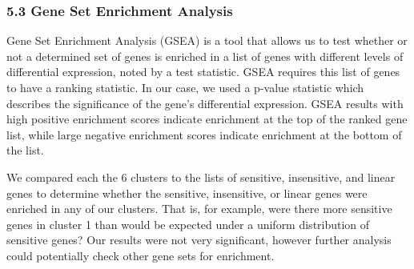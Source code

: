 \documentclass[]{article}
\begin{document}
\subsubsection{\texorpdfstring{\textbf{5.3} Gene Set Enrichment
Analysis}{5.3 Gene Set Enrichment Analysis}}\label{gene-set-enrichment-analysis}

Gene Set Enrichment Analysis (GSEA) is a tool that allows us to test
whether or not a determined set of genes is enriched in a list of genes
with different levels of differential expression, noted by a test
statistic. GSEA requires this list of genes to have a ranking statistic.
In our case, we used a p-value statistic which describes the
significance of the gene's differential expression. GSEA results with
high positive enrichment scores indicate enrichment at the top of the
ranked gene list, while large negative enrichment scores indicate
enrichment at the bottom of the list.

We compared each the 6 clusters to the lists of sensitive, insensitive,
and linear genes to determine whether the sensitive, insensitive, or
linear genes were enriched in any of our clusters. That is, for example,
were there more sensitive genes in cluster 1 than would be expected
under a uniform distribution of sensitive genes? Our results were not
very significant, however further analysis could potentially check other
gene sets for enrichment.
\end{document}
